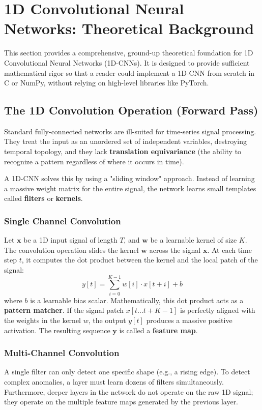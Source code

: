 \section{1D Convolutional Neural Networks: Theoretical Background}
This section provides a comprehensive, ground-up theoretical foundation for 1D Convolutional Neural Networks (1D-CNNs). It is designed to provide sufficient mathematical rigor so that a reader could implement a 1D-CNN from scratch in C or NumPy, without relying on high-level libraries like PyTorch.

\subsection{The 1D Convolution Operation (Forward Pass)}
Standard fully-connected networks are ill-suited for time-series signal processing. They treat the input as an unordered set of independent variables, destroying temporal topology, and they lack \textbf{translation equivariance} (the ability to recognize a pattern regardless of where it occurs in time).

A 1D-CNN solves this by using a "sliding window" approach. Instead of learning a massive weight matrix for the entire signal, the network learns small templates called \textbf{filters} or \textbf{kernels}.

\subsubsection{Single Channel Convolution}
Let $\mathbf{x}$ be a 1D input signal of length $T$, and $\mathbf{w}$ be a learnable kernel of size $K$. The convolution operation slides the kernel $\mathbf{w}$ across the signal $\mathbf{x}$. At each time step $t$, it computes the dot product between the kernel and the local patch of the signal:
\begin{equation}
    y[t] = \sum_{i=0}^{K-1} w[i] \cdot x[t + i] + b
\end{equation}
where $b$ is a learnable bias scalar. Mathematically, this dot product acts as a \textbf{pattern matcher}. If the signal patch $x[t \dots t+K-1]$ is perfectly aligned with the weights in the kernel $w$, the output $y[t]$ produces a massive positive activation. The resulting sequence $\mathbf{y}$ is called a \textbf{feature map}.

\subsubsection{Multi-Channel Convolution}
A single filter can only detect one specific shape (e.g., a rising edge). To detect complex anomalies, a layer must learn dozens of filters simultaneously. Furthermore, deeper layers in the network do not operate on the raw 1D signal; they operate on the multiple feature maps generated by the previous layer.

